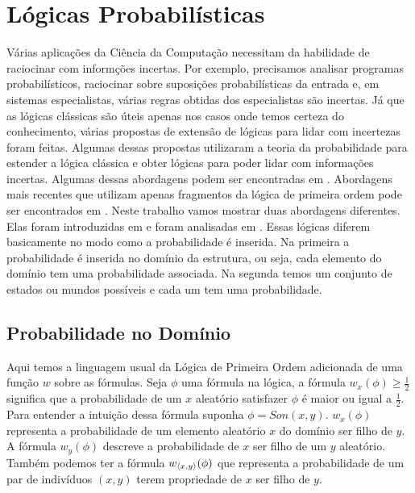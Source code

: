 \pagestyle{empty}
\cleardoublepage
\pagestyle{fancy}
\chapter{Lógicas Probabilísticas}\label{cap4}

Várias aplicações da Ciência da Computação necessitam da habilidade de raciocinar com informções incertas. Por exemplo, precisamos analisar programas probabilísticos, raciocinar sobre suposições probabilísticas da entrada e, em sistemas especialistas, várias regras obtidas dos especialistas são incertas. Já que as lógicas clássicas são úteis apenas nos casos onde temos certeza do conhecimento, várias propostas de extensão de lógicas para lidar com incertezas foram feitas. Algumas dessas propostas utilizaram a teoria da probabilidade para estender a lógica clássica e obter lógicas para poder lidar com informações incertas. Algumas dessas abordagens podem ser encontradas em \cite{fagin88, nilsson93, nilsson86, Halpern90ananalysis, Abadi1989, Fagin1994}. Abordagens mais recentes que utilizam apenas fragmentos da lógica de primeira ordem pode ser encontrados em \cite{Lukasiewicz08, LutzSchoder10, DurigStuder05, Cozman08LPP, TaoWHL07}.
Neste trabalho vamos mostrar duas abordagens diferentes. Elas foram introduzidas em \cite{Bacchus1991, Bacchus90} e foram analisadas em \cite{Halpern90ananalysis, Abadi1989}. Essas lógicas diferem basicamente no modo como a probabilidade é inserida.
Na primeira a probabilidade é inserida no domínio da estrutura, ou seja, cada elemento do domínio tem uma probabilidade associada. Na segunda temos um conjunto de estados ou mundos possíveis e cada um tem uma probabilidade.

\section{Probabilidade no Domínio}
Aqui temos a linguagem usual da Lógica de Primeira Ordem adicionada de uma função $w$ sobre as fórmulas. Seja $\phi$ uma fórmula na lógica, a fórmula $w_x(\phi) \ge \frac{1}{2}$ significa que a probabilidade de um $x$ aleatório satisfazer $\phi$ é maior ou igual a $\frac{1}{2}$. Para entender a intuição dessa fórmula suponha $\phi = Son(x, y)$. $w_x(\phi)$ representa a probabilidade de um elemento aleatório $x$ do domínio ser filho de $y$. A fórmula $w_y(\phi)$ descreve a probabilidade de $x$ ser filho de um $y$ aleatório. Também podemos ter a fórmula $w_{\left \langle x, y \right \rangle }(\phi)$ que representa a probabilidade de um par de indivíduos $(x, y)$ terem  propriedade de $x$ ser filho de $y$.

